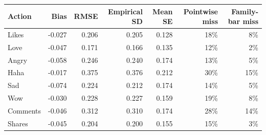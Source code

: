 \begin{tabular}{lrrrrrr}
\toprule
Action & Bias & RMSE & Empirical SD & Mean SE & Pointwise miss & Family-bar miss \\
\midrule
Likes & -0.027 & 0.206 & 0.205 & 0.128 & 18\% & 8\% \\
Love & -0.047 & 0.171 & 0.166 & 0.135 & 12\% & 2\% \\
Angry & -0.058 & 0.246 & 0.240 & 0.174 & 13\% & 5\% \\
Haha & -0.017 & 0.375 & 0.376 & 0.212 & 30\% & 15\% \\
Sad & -0.074 & 0.224 & 0.212 & 0.174 & 14\% & 5\% \\
Wow & -0.030 & 0.228 & 0.227 & 0.159 & 19\% & 8\% \\
Comments & -0.046 & 0.312 & 0.310 & 0.174 & 28\% & 14\% \\
Shares & -0.045 & 0.204 & 0.200 & 0.155 & 15\% & 3\% \\
\bottomrule
\end{tabular}
